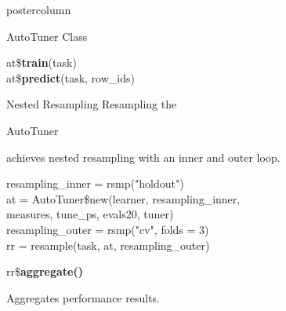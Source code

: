 \documentclass{beamer}
\newcommand{\codeinline}[1]{\begin{codeboxinline}#1\end{codeboxinline}}
\begin{document}
\begin{frame}[fragile]{}
\begin{columns}
\begin{column}{.245\textwidth}
\begin{beamercolorbox}[center]{postercolumn}
\begin{minipage}{.98\textwidth}
{\begin{myblock}{AutoTuner Class}
							\begin{codeboxmultiline}[width=16.5cm]
								at\$\textbf{train}(task)\\
								at\$\textbf{predict}(task, row\_ids)
							\end{codeboxmultiline}
						\end{myblock}
						\begin{myblock}{Nested Resampling}
							Resampling the \codeinline{AutoTuner} achieves nested resampling with an inner and outer loop. 
							\\
							\begin{codeboxexample}
								\footnotesize{
									resampling\_inner = rsmp("holdout")
									\vspace{1em}
									\\
									at = AutoTuner\$new(learner, resampling\_inner, \\
									\hspace*{1ex}measures, tune\_ps, evals20, tuner)
									\vspace{1em}
									\\
									resampling\_outer = rsmp("cv", folds = 3)\\
									rr = resample(task, at, resampling\_outer)
								}
							\end{codeboxexample}
							\vspace{1em}
							\begin{codebox}
								rr\$\textbf{aggregate()}
							\end{codebox}
							Aggregates performance results.
						\end{myblock}
						\vfill}
				\end{minipage}
			\end{beamercolorbox}
		\end{column}
	\end{columns}
\end{frame}
\end{document}
